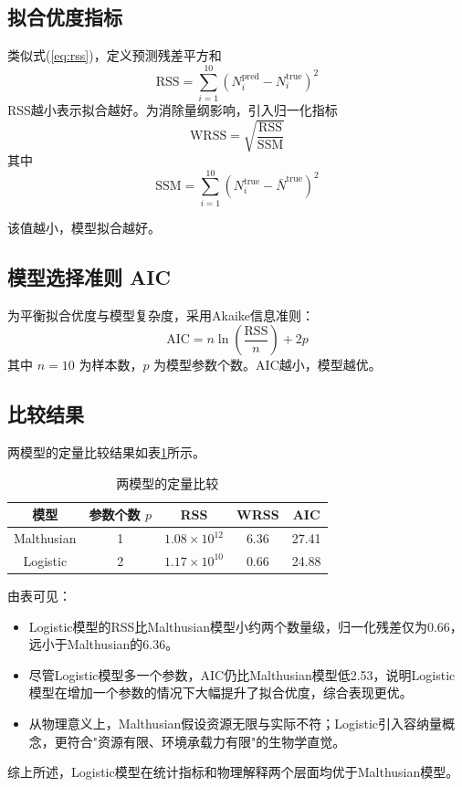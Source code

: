 \subsection{拟合优度指标}
类似式(\ref{eq:rss})，定义预测残差平方和
\[
\text{RSS} = \sum_{i=1}^{10} (N_i^{\text{pred}} - N_i^{\text{true}})^2
\]
RSS越小表示拟合越好。为消除量纲影响，引入归一化指标
\[
\text{WRSS}=\sqrt{\frac{\text{RSS}}{\text{SSM}}}
\]
其中
$$
\text{SSM} = \sum_{i=1}^{10} (N_i^{\text{true}} - \bar{N}^{\text{true}})^2
$$

该值越小，模型拟合越好。
\subsection{模型选择准则 AIC}
为平衡拟合优度与模型复杂度，采用Akaike信息准则：
\[
\text{AIC} = n\ln\left(\frac{\text{RSS}}{n}\right) + 2p
\]
其中 $n=10$ 为样本数，$p$ 为模型参数个数。AIC越小，模型越优。

\subsection{比较结果}
两模型的定量比较结果如表\ref{tab:model_compare}所示。

\begin{table}[htbp]
\centering
\caption{两模型的定量比较}
\label{tab:model_compare}
\begin{tabular}{ccccc}
\toprule
模型 & 参数个数 $p$ & RSS & WRSS & AIC \\
\midrule
Malthusian & 1 & $1.08\times10^{12}$ & 6.36 & 27.41 \\
Logistic   & 2 & $1.17\times10^{10}$ & 0.66 & 24.88 \\
\bottomrule
\end{tabular}
\end{table}

由表可见：
\begin{itemize}
    \item Logistic模型的RSS比Malthusian模型小约两个数量级，归一化残差仅为0.66，远小于Malthusian的6.36。
    \item 尽管Logistic模型多一个参数，AIC仍比Malthusian模型低2.53，说明Logistic模型在增加一个参数的情况下大幅提升了拟合优度，综合表现更优。
    \item 从物理意义上，Malthusian假设资源无限与实际不符；Logistic引入容纳量概念，更符合"资源有限、环境承载力有限"的生物学直觉。
\end{itemize}

综上所述，Logistic模型在统计指标和物理解释两个层面均优于Malthusian模型。

